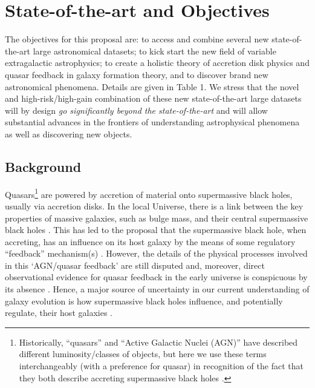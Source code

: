 \section{State-of-the-art and Objectives}
\noindent
The objectives for this proposal are: to access and combine several
new state-of-the-art large astronomical datasets; to kick start the
new field of variable extragalactic astrophysics; to create a holistic
theory of accretion disk physics and quasar feedback in galaxy
formation theory, and to discover brand new astronomical phenomena.
Details are given in Table 1.  We stress that the novel and
high-risk/high-gain combination of these new state-of-the-art large
datasets will by design {\it go significantly beyond the
state-of-the-art} and will allow substantial advances in the frontiers
of understanding astrophysical phenomena as well as discovering new
objects.


\subsection{Background}
\noindent
Quasars\footnote{ Historically, ``quasars'' and ``Active Galactic
Nuclei (AGN)'' have described different luminosity/classes of objects,
but here we use these terms interchangeably (with a preference for 
quasar) in recognition of the fact that they both describe accreting
supermassive black holes \citet[e.g.][]{Haardt2016book}.}  are powered by
accretion of material onto supermassive black holes, usually via
accretion disks.
In the local Universe, there is a link between the key properties of
massive galaxies, such as bulge mass, and their central supermassive
black holes \citep[SMBHs; e.g., ][]{McLure_Dunlop2002, HaringRix2004,
Salviander2007, Greene2010, KormendyHo2013}. This has led to the
proposal that the supermassive black hole, when accreting, has an
influence on its host galaxy by the means of some regulatory
``feedback'' mechanism(s) \citep[e.g., ][]{Sijacki2007, Hopkins2008a,
AlexanderHickox2012, Fabian2012, KingPounds2015}. However, the details
of the physical processes involved in this `AGN/quasar feedback' are still
disputed and, moreover, direct observational evidence for quasar
feedback in the early universe is conspicuous by its absence
\citep[e.g., ][]{HeckmanBest2014, NaabOstriker2017}. Hence, a major
source of uncertainty in our current understanding of galaxy evolution
is how supermassive black holes influence, and potentially regulate,
their host galaxies \citep{Vogelsberger2013, Vogelsberger2014,
Schaye2015, Angles-Alcazar2013, Angles-Alcazar2017}.

